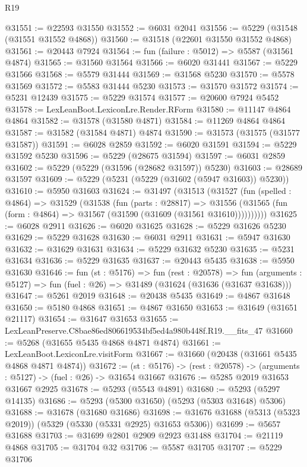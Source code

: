 \begin{lexlean}{R19}
\begin{coremodule}
@31551 := @22593 @31550
@31552 := @6031 @2041
@31556 := @5229 (@31548 (@31551 @31552 @4868))
@31560 := @31518 (@22601 @31550 @31552 @4868)
@31561 := @20443 @7924
@31564 := fun (failure : @5012) => @5587 (@31561 @4874)
@31565 := @31560 @31564
@31566 := @6020 @31441
@31567 := @5229 @31566
@31568 := @5579 @31444
@31569 := @31568 @5230
@31570 := @5578 @31569
@31572 := @5583 @31444 @5230
@31573 := @31570 @31572
@31574 := @5231 @12439
@31575 := @5229 @31574
@31577 := @20600 @7924 @5452
@31578 := LexLeanBoot.LexiconLre.Render.RForm
@31580 := @11147 @4864 @4864
@31582 := @31578 (@31580 @4871)
@31584 := @11269 @4864 @4864
@31587 := @31582 (@31584 @4871) @4874
@31590 := @31573 (@31575 (@31577 @31587))
@31591 := @6028 @2859
@31592 := @6020 @31591
@31594 := @5229 @31592 @5230
@31596 := @5229 (@28675 @31594)
@31597 := @6031 @2859
@31602 := @5229 (@5229 (@31596 (@28682 @31597)) @5230)
@31603 := @28689 @31597
@31609 := @5229 (@5231 (@5229 (@31602 (@5947 @31603)) @5230))
@31610 := @5950 @31603
@31624 := @31497
    (@31513
      (@31527
        (fun (spelled : @4864) =>
        @31529
          (@31538
            (fun (parts : @28817) =>
            @31556 (@31565 (fun (form : @4864) => @31567 (@31590 (@31609 (@31561 @31610))))))))))
@31625 := @6028 @2911
@31626 := @6020 @31625
@31628 := @5229 @31626 @5230
@31629 := @5229 @31628
@31630 := @6031 @2911
@31631 := @5947 @31630
@31632 := @31629 @31631
@31634 := @5229 @31632 @5230
@31635 := @5231 @31634
@31636 := @5229 @31635
@31637 := @20443 @5435
@31638 := @5950 @31630
@31646 := fun (st : @5176) =>
  fun (rest : @20578) =>
  fun (arguments : @5127) => fun (fuel : @26) => @31489 (@31624 (@31636 (@31637 @31638)))
@31647 := @5261 @2019
@31648 := @20438 @5435
@31649 := @4867 @31648
@31650 := @5180 @4868
@31651 := @4867 @31650
@31653 := @31649 (@31651 @21117)
@31654 := @31647 @31653
@31655 := LexLeanPreserve.C8bae86ed806619534bf5ed4a980b448f.R19.__fits_47
@31660 := @5268 (@31655 @5435 @4868 @4871 @4874)
@31661 := LexLeanBoot.LexiconLre.visitForm
@31667 := @31660 (@20438 (@31661 @5435 @4868 @4871 @4874))
@31672 := (st : @5176) -> (rest : @20578) -> (arguments : @5127) -> (fuel : @26) -> @31654 @31667
@31676 := @5285 @2019 @31653 @31667 @2925
@31678 := @5293 (@5543 @4891)
@31680 := @5293 (@5297 @14135)
@31686 := @5293 (@5300 @31650) (@5293 (@5303 @31648) @5306)
@31688 := @31678 (@31680 @31686)
@31698 := @31676 @31688 (@5313 (@5323 @2019)) (@5329 (@5330 (@5331 @2925) @31653 @5306))
@31699 := @5657 @31688
@31703 := @31699 @2801 @2909 @2923 @31488
@31704 := @21119 @4868
@31705 := @31704 @32
@31706 := @5587 @31705
@31707 := @5229 @31706

\end{coremodule}
\end{lexlean}
